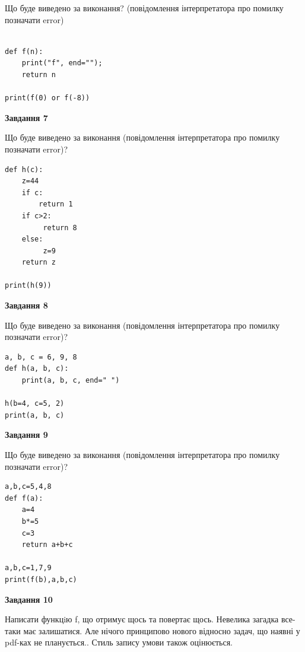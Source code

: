 \documentclass[12pt, ukrainian]{article}
\begin{document}
{\begin {large}
Що буде виведено за виконання? (повідомлення інтерпретатора про помилку позначати error)\par
\begin{verbatim}

def f(n):
    print("f", end="");
    return n

print(f(0) or f(-8))
\end{verbatim}

{\begin {center}\textbf{Завдання 7}\end {center}}

Що буде виведено за виконання (повідомлення інтерпретатора про помилку позначати error)?\par
\begin{verbatim}
def h(c):
    z=44
    if c: 
        return 1
    if c>2:
         return 8
    else:
         z=9
    return z

print(h(9))
\end{verbatim}

{\begin {center}\textbf{Завдання 8}\end {center}}

Що буде виведено за виконання (повідомлення інтерпретатора про помилку позначати error)?\par
\begin{verbatim}
a, b, c = 6, 9, 8
def h(a, b, c):
    print(a, b, c, end=" ")

h(b=4, c=5, 2)
print(a, b, c)
\end{verbatim}

{\begin {center}\textbf{Завдання 9}\end {center}}

Що буде виведено за виконання (повідомлення інтерпретатора про помилку позначати error)?\par
\begin{verbatim}
a,b,c=5,4,8
def f(a):
    a=4
    b*=5
    c=3
    return a+b+c

a,b,c=1,7,9
print(f(b),a,b,c)
\end{verbatim}

{\begin {center}\textbf{Завдання 10}\end {center}}


Написати функцiю f, що отримує щось та повертає щось. Невелика загадка все-таки має залишатися. Але нічого принципово нового відносно задач, що наявні у pdf-ках не планується.. Стиль запису умови також оцінюється.\par
\end {large}}
\newpage
\end{document}
